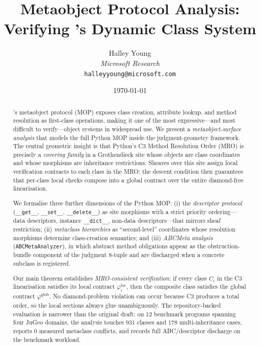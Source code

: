 \documentclass[11pt]{article}
\title{Metaobject Protocol Analysis:\\
       Verifying \Python{}'s Dynamic Class System}
\author{%
  Halley Young\\
  \textit{Microsoft Research}\\
  \texttt{halleyyoung@microsoft.com}
}
\date{\today}
\newcommand{\Dget}{\texttt{\_\_get\_\_}}
\newcommand{\Dset}{\texttt{\_\_set\_\_}}
\newcommand{\Ddel}{\texttt{\_\_delete\_\_}}
\newcommand{\InstDict}{\texttt{\_\_dict\_\_}}
\newcommand{\LocalContr}[1]{\varphi_{#1}^{\mathrm{loc}}}
\newcommand{\GlobalContr}[1]{\varphi_{#1}^{\mathrm{glob}}}
\newcommand{\ABCAnalyzer}{\texttt{ABCMetaAnalyzer}}
\begin{document}
\maketitle

\begin{abstract}
\Python{}'s metaobject protocol (MOP) exposes class creation, attribute
lookup, and method resolution as first-class operations, making it one
of the most expressive---and most difficult to verify---object systems
in widespread use.
We present a \emph{metaobject-surface analysis} that models the full
Python MOP inside the \JuGeo{} judgment-geometry framework.
The central geometric insight is that Python's C3 Method Resolution
Order (MRO) is precisely a \emph{covering family} in a Grothendieck
site whose objects are class coordinates and whose morphisms are
inheritance restrictions.
Sheaves over this site assign local verification contracts to each class
in the MRO; the descent condition then guarantees that per-class local
checks compose into a global contract over the entire diamond-free
linearisation.

We formalise three further dimensions of the Python MOP:
(i) the \emph{descriptor protocol} (\Dget, \Dset, \Ddel) as site
morphisms with a strict priority ordering---data descriptors, instance
\InstDict, non-data descriptors---that mirrors sheaf restriction;
(ii) \emph{metaclass hierarchies} as ``second-level'' coordinates whose
resolution morphisms determine class-creation semantics; and
(iii) \emph{ABCMeta analysis} (\ABCAnalyzer), in which abstract method
obligations appear as the obstruction-bundle component of the judgment
8-tuple and are discharged when a concrete subclass is registered.

Our main theorem establishes \emph{MRO-consistent verification}: if
every class $C_i$ in the C3 linearisation satisfies its local contract
$\LocalContr{i}$, then the composite class satisfies the global
contract $\GlobalContr{}$.
No diamond-problem violation can occur because C3 produces a total
order, so the local sections always glue unambiguously.
The repository-backed evaluation is narrower than the original draft:
on 12 benchmark programs spanning four JuGeo domains, the analysis
touches 931 classes and 178 multi-inheritance cases, reports 0 measured
metaclass conflicts, and records full ABC/descriptor discharge on the
benchmark workload.
\end{abstract}

\newpage
\end{document}
